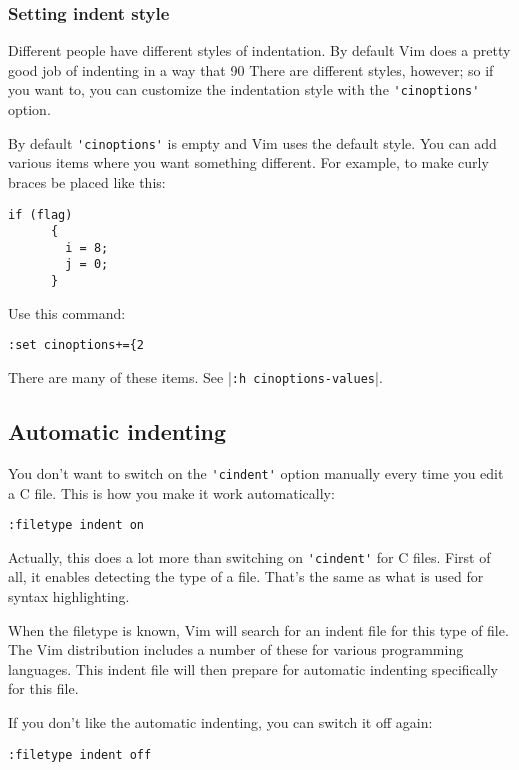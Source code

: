 \subsubsection{Setting indent style}
Different people have different styles of indentation.
By default Vim does a pretty good job of indenting in a way that 90%
There are different styles, however; so if you want to, you can customize the indentation style with the \verb!'cinoptions'! option.

By default \verb!'cinoptions'! is empty and Vim uses the default style.
You can add various items where you want something different.
For example, to make curly braces be placed like this:

\begin{Verbatim}[samepage=true]
    if (flag) 
      { 
        i = 8; 
        j = 0; 
      } 
\end{Verbatim}

Use this command:

\begin{Verbatim}[samepage=true]
 :set cinoptions+={2
\end{Verbatim}

There are many of these items.  See |\verb!:h cinoptions-values!|.
\subsection{Automatic indenting}
You don't want to switch on the \verb!'cindent'! option manually every time you edit a C file.
This is how you make it work automatically:

\begin{Verbatim}[samepage=true]
 :filetype indent on
\end{Verbatim}

Actually, this does a lot more than switching on \verb!'cindent'! for C files.
First of all, it enables detecting the type of a file.
That's the same as what is used for syntax highlighting.

When the filetype is known, Vim will search for an indent file for this type of file.
The Vim distribution includes a number of these for various programming languages.
This indent file will then prepare for automatic indenting specifically for this file.

If you don't like the automatic indenting, you can switch it off again:

\begin{Verbatim}[samepage=true]
 :filetype indent off
\end{Verbatim}

